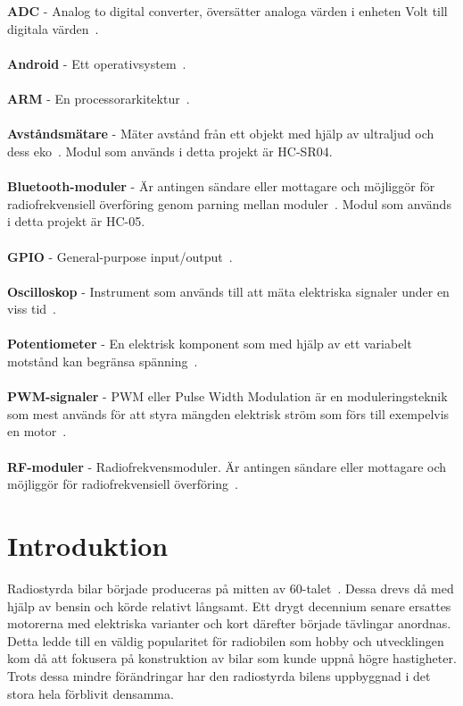\documentclass[a4paper]{article}
\begin{document}
\newpage
{}
\\\\
{\bf ADC} - Analog to digital converter, översätter analoga värden i enheten Volt till digitala värden~\cite{ADC}.
\\\\
{\bf Android} - Ett operativsystem~\cite{Android}.
\\\\
{\bf ARM} - En processorarkitektur~\cite{chalmersARM}.
\\\\
{\bf Avståndsmätare} - Mäter avstånd från ett objekt med hjälp av ultraljud och dess eko~\cite{DistMeasure}. Modul som används i detta projekt är HC-SR04.
\\\\
{\bf Bluetooth-moduler} - Är antingen sändare eller mottagare och möjliggör för radiofrekvensiell överföring genom parning mellan moduler~\cite{Bluetooth}. Modul som används i detta projekt är HC-05.
\\\\
{\bf GPIO} - General-purpose input/output~\cite{chalmersARM}.
\\\\
{\bf Oscilloskop} - Instrument som används till att mäta elektriska signaler under en viss tid~\cite{oscilloscope}.
\\\\
{\bf Potentiometer} - En elektrisk komponent som med hjälp av ett variabelt motstånd kan begränsa spänning~\cite{Potentiometer}.
\\\\
{\bf PWM-signaler} - PWM eller Pulse Width Modulation är en moduleringsteknik som mest används för att styra mängden elektrisk ström som förs till exempelvis en motor~\cite{PWM}.
\\\\
{\bf RF-moduler} - Radiofrekvensmoduler. Är antingen sändare eller mottagare och möjliggör för radiofrekvensiell överföring~\cite{RFModule}.





\newpage
\section{Introduktion}
Radiostyrda bilar började produceras på mitten av 60-talet~\cite{RCHistory}. Dessa drevs då med hjälp av bensin och körde relativt långsamt. Ett drygt decennium senare ersattes motorerna med elektriska varianter och kort därefter började tävlingar anordnas. Detta ledde till en väldig popularitet för radiobilen som hobby och utvecklingen kom då att fokusera på konstruktion av bilar som kunde uppnå högre hastigheter. Trots dessa mindre förändringar har den radiostyrda bilens uppbyggnad i det stora hela förblivit densamma.
\end{document}
